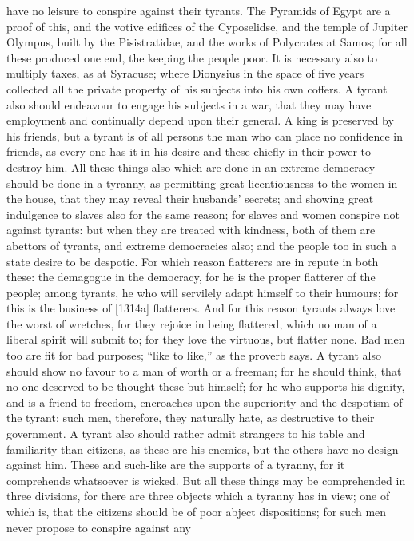 have no leisure to conspire against their tyrants. The Pyramids of Egypt
are a proof of this, and the votive edifices of the Cyposelidse, and the
temple of Jupiter Olympus, built by the Pisistratidae, and the works of
Polycrates at Samos; for all these produced one end, the keeping the
people poor. It is necessary also to multiply taxes, as at Syracuse; where
Dionysius in the space of five years collected all the private property of
his subjects into his own coffers. A tyrant also should endeavour to
engage his subjects in a war, that they may have employment and
continually depend upon their general. A king is preserved by his friends,
but a tyrant is of all persons the man who can place no confidence in
friends, as every one has it in his desire and these chiefly in their
power to destroy him. All these things also which are done in an extreme
democracy should be done in a tyranny, as permitting great licentiousness
to the women in the house, that they may reveal their husbands' secrets;
and showing great indulgence to slaves also for the same reason; for
slaves and women conspire not against tyrants: but when they are treated
with kindness, both of them are abettors of tyrants, and extreme
democracies also; and the people too in such a state desire to be
despotic. For which reason flatterers are in repute in both these: the
demagogue in the democracy, for he is the proper flatterer of the people;
among tyrants, he who will servilely adapt himself to their humours; for
this is the business of [1314a] flatterers. And for this reason tyrants
always love the worst of wretches, for they rejoice in being flattered,
which no man of a liberal spirit will submit to; for they love the
virtuous, but flatter none. Bad men too are fit for bad purposes; ``like to
like,'' as the proverb says. A tyrant also should show no favour to a man
of worth or a freeman; for he should think, that no one deserved to be
thought these but himself; for he who supports his dignity, and is a
friend to freedom, encroaches upon the superiority and the despotism of
the tyrant: such men, therefore, they naturally hate, as destructive to
their government. A tyrant also should rather admit strangers to his table
and familiarity than citizens, as these are his enemies, but the others
have no design against him. These and such-like are the supports of a
tyranny, for it comprehends whatsoever is wicked. But all these things may
be comprehended in three divisions, for there are three objects which a
tyranny has in view; one of which is, that the citizens should be of poor
abject dispositions; for such men never propose to conspire against any
